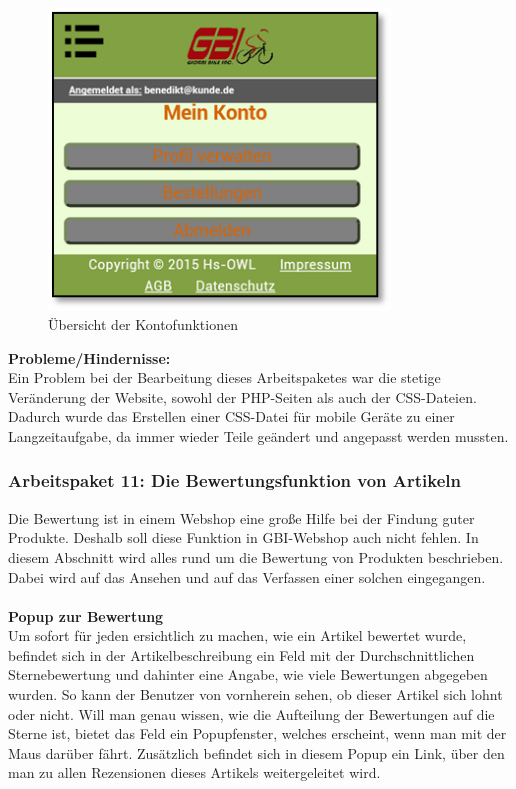\begin{figure}[H]
\begin{center}
\includegraphics[height=8cm]{Bilder/Michael_Abbildung9-UebersichtDerKontofunktionen.png}
\end{center}
\caption{Übersicht der Kontofunktionen}
\end{figure}

\newpage
\textbf{Probleme/Hindernisse:}
\\
Ein Problem bei der Bearbeitung dieses Arbeitspaketes war die stetige Veränderung der Website, sowohl der PHP-Seiten als auch der CSS-Dateien. Dadurch wurde das Erstellen einer CSS-Datei für mobile Geräte zu einer Langzeitaufgabe, da immer wieder Teile geändert und angepasst werden mussten. 


\subsubsection{Arbeitspaket 11: Die Bewertungsfunktion von Artikeln}

Die Bewertung ist in einem Webshop eine große Hilfe bei der Findung guter Produkte. Deshalb soll diese Funktion in GBI-Webshop auch nicht fehlen. 
In diesem Abschnitt wird alles rund um die Bewertung von Produkten beschrieben. Dabei wird auf das Ansehen und auf das Verfassen einer solchen eingegangen.
\\ \\
\textbf{Popup zur Bewertung}
\\
Um sofort für jeden ersichtlich zu machen, wie ein Artikel bewertet wurde, befindet sich in der Artikelbeschreibung ein Feld mit der Durchschnittlichen Sternebewertung und dahinter eine Angabe, wie viele Bewertungen abgegeben wurden. So kann der Benutzer von vornherein sehen, ob dieser Artikel sich lohnt oder nicht. Will man genau wissen, wie die Aufteilung der Bewertungen auf die Sterne ist, bietet das Feld ein Popupfenster, welches erscheint, wenn man mit der Maus darüber fährt. Zusätzlich befindet sich in diesem Popup ein Link, über den man zu allen Rezensionen dieses Artikels weitergeleitet wird.

